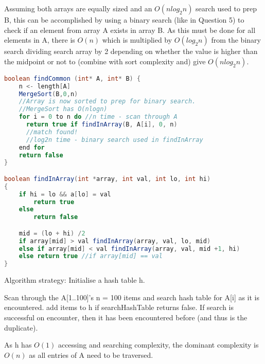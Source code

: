 \documentclass[11pt, a4paper]{article}
\begin{document}
  \vspace{40mm}


Assuming both arrays are equally sized and an $O(n log_2 n)$ search used to prep B, this can be accomplished by using a
binary search (like in Question 5) to check if an element from array A exists
in array B. As this must be done for all elements in A, there is $O(n)$ which is
multiplied by $O(log_2 n)$ from the binary search dividing search array by 2 depending on whether the value is higher than the midpoint or not to (combine with sort complexity and) give $O(n log_2 n)$.


\begin{lstlisting}[frame=single, language=java]
boolean findCommon (int* A, int* B) {
    n <- length[A]
    MergeSort(B,0,n)
    //Array is now sorted to prep for binary search. 
    //MergeSort has O(nlogn)
    for i = 0 to n do //n time - scan through A
      return true if findInArray(B, A[i], 0, n) 
      //match found!
      //log2n time - binary search used in findInArray
    end for
    return false
}

boolean findInArray(int *array, int val, int lo, int hi)
{
    if hi = lo && a[lo] = val  
        return true
    else 
        return false

    mid = (lo + hi) /2
    if array[mid] > val findInArray(array, val, lo, mid)
    else if array[mid] < val findInArray(array, val, mid +1, hi)
    else return true //if array[mid] == val 
}

\end{lstlisting}


Algorithm strategy:
Initialise a hash table h. 

Scan through the A[1..100]'s n = 100 items and search hash table for A[i] as it is encountered. add items to h if searchHashTable returns false. If search is successful on encounter, then it has been encountered before (and thus is the duplicate).

As h has $O(1)$ accessing and searching complexity, the dominant complexity is $O(n)$ as all entries of A need to be traversed.
\end{document}
